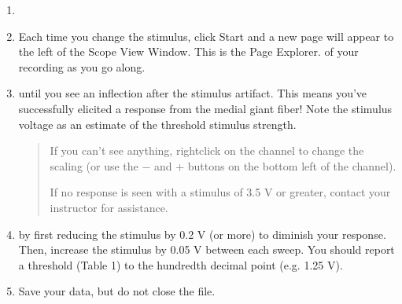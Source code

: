 \documentclass[letterpaper,10pt,english]{jupyterBook}
\begin{document}
\begin{enumerate}
\item {} 
\sphinxAtStartPar
{}

\item {} 
\sphinxAtStartPar
Each time you change the stimulus, click Start and a new page will appear to the left of the Scope View Window. This is the Page Explorer.  of your recording as you go along.

\item {} 
\sphinxAtStartPar
{} until you see an inflection after the stimulus artifact. This means you’ve successfully elicited a response from the medial giant fiber! Note the stimulus voltage as an estimate of the threshold stimulus strength.
\begin{quote}

\sphinxAtStartPar
{} If you can’t see anything, right\sphinxhyphen{}click on the channel to change the scaling (or use the − and + buttons on the bottom left of the channel).

\sphinxAtStartPar
{} If no response is seen with a stimulus of 3.5 V or greater, contact your instructor for assistance.
\end{quote}

\item {} 
\sphinxAtStartPar
{} by first reducing the stimulus by 0.2 V (or more) to diminish your response. Then, increase the stimulus by 0.05 V between each sweep. You should report a threshold (Table 1) to the hundredth decimal point (e.g. 1.25 V).

\item {} 
\sphinxAtStartPar
Save your data, but do not close the file.

\end{enumerate}
\end{document}
